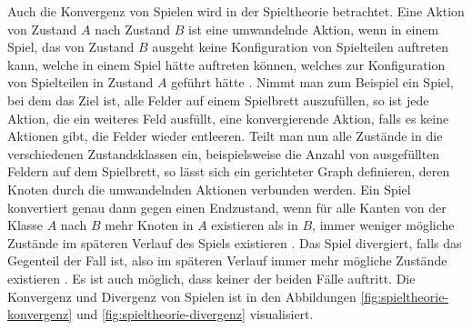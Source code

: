 Auch die Konvergenz von Spielen wird in der Spieltheorie betrachtet. Eine Aktion von Zustand $A$ nach Zustand $B$ ist eine umwandelnde Aktion, wenn in einem Spiel, das von Zustand $B$ ausgeht keine Konfiguration von Spielteilen auftreten kann, welche in einem Spiel hätte auftreten können, welches zur Konfiguration von Spielteilen in Zustand $A$ geführt hätte \cite[S. 157]{1194.SearchAndAiInGames}. Nimmt man zum Beispiel ein Spiel, bei dem das Ziel ist, alle Felder auf einem Spielbrett auszufüllen, so ist jede Aktion, die ein weiteres Feld ausfüllt, eine konvergierende Aktion, falls es keine Aktionen gibt, die Felder wieder entleeren. Teilt man nun alle Zustände in die verschiedenen Zustandsklassen ein, beispielsweise die Anzahl von ausgefüllten Feldern auf dem Spielbrett, so lässt sich ein gerichteter Graph definieren, deren Knoten durch die umwandelnden Aktionen verbunden werden. Ein Spiel konvertiert genau dann gegen einen Endzustand, wenn für alle Kanten von der Klasse $A$ nach $B$ mehr Knoten in $A$ existieren als in $B$, \dash immer weniger mögliche Zustände im späteren Verlauf des Spiels existieren \cite[S. 157]{1194.SearchAndAiInGames}. Das Spiel divergiert, falls das Gegenteil der Fall ist, also im späteren Verlauf immer mehr mögliche Zustände existieren \cite[S. 157]{1194.SearchAndAiInGames}. Es ist auch möglich, dass keiner der beiden Fälle auftritt. Die Konvergenz und Divergenz von Spielen ist in den Abbildungen \ref{fig:spieltheorie-konvergenz} und \ref{fig:spieltheorie-divergenz} visualisiert.

